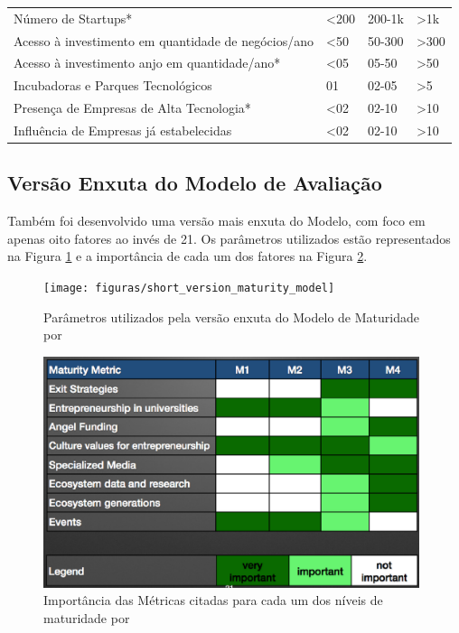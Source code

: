 \begin{table}[!htb]
\begin{tabular}{llll}
Número de Startups*                                        &    <200    &   200-1k   &    >1k      \\
Acesso à investimento em quantidade de negócios/ano        &    <50     &   50-300   &    >300     \\
Acesso à investimento anjo em quantidade/ano*              &    <05     &   05-50    &    >50      \\
Incubadoras e Parques Tecnológicos                         &     01     &    02-05   &    >5       \\
Presença de Empresas de Alta Tecnologia*                   &    <02     &   02-10    &    >10      \\
Influência de Empresas já estabelecidas                    &    <02     &   02-10    &    >10      \\
\end{tabular}
\end{table}

\subsection{Versão Enxuta do Modelo de Avaliação}
\label{subsection:versao_enxuta_do_modelo_de_avaliacao}

Também foi desenvolvido uma versão mais enxuta do Modelo, com foco em apenas oito fatores ao invés de 21. Os parâmetros utilizados estão representados na Figura \ref{figure:short_version_maturity_model} e a importância de cada um dos fatores na Figura \ref{figure:metrics_importance}.

\begin{figure}[!htb]
\centering
\texttt{[image: figuras/short\_version\_maturity\_model]}
\caption{Parâmetros utilizados pela versão enxuta do Modelo de Maturidade por }
\label{figure:short_version_maturity_model}
\end{figure}

\begin{figure}[!htb]
\centering
\includegraphics[width=11cm,angle=0]{figuras/metrics_importance}
\caption{Importância das Métricas citadas para cada um dos níveis de maturidade por }
\label{figure:metrics_importance}
\end{figure}

